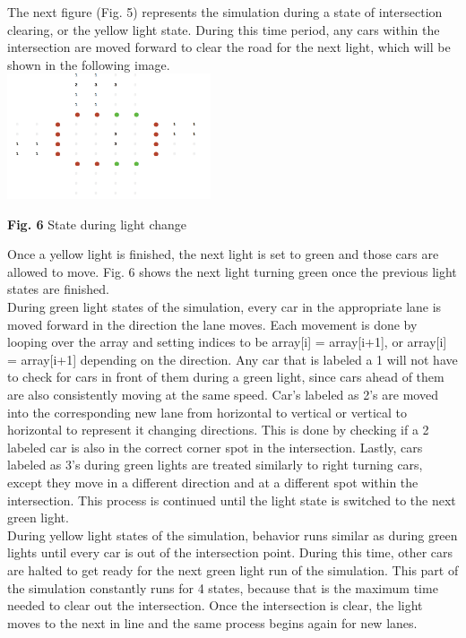 \documentclass[conference]{IEEEtran}
\begin{document}
The next figure (Fig. 5) represents the simulation during a state of intersection clearing, or the yellow light state. During this time period, any cars within the intersection are moved forward to clear the road for the next light, which will be shown in the following image. \\

\includegraphics[width=0.45\textwidth]{images/red}
\begin{center}
	\textbf{Fig. 6} State during light change  \\
\end{center}

Once a yellow light is finished, the next light is set to green and those cars are allowed to move. Fig. 6 shows the next light turning green once the previous light states are finished. \\

\hspace*{.2cm} During green light states of the simulation, every car in the appropriate lane is moved forward in the direction the lane moves. Each movement is done by looping over the array and setting indices to be array[i] = array[i+1], or array[i] = array[i+1] depending on the direction. Any car that is labeled a 1 will not have to check for cars in front of them during a green light, since cars ahead of them are also consistently moving at the same speed. Car's labeled as 2's are moved into the corresponding new lane from horizontal to vertical or vertical to horizontal to represent it changing directions. This is done by checking if a 2 labeled car is also in the correct corner spot in the intersection. Lastly, cars labeled as 3's during green lights are treated similarly to right turning cars, except they move in a different direction and at a different spot within the intersection. This process is continued until the light state is switched to the next green light. \\

\hspace*{.2cm} During yellow light states of the simulation, behavior runs similar as during green lights until every car is out of the intersection point. During this time, other cars are halted to get ready for the next green light run of the simulation. This part of the simulation constantly runs for 4 states, because that is the maximum time needed to clear out the intersection. Once the intersection is clear, the light moves to the next in line and the same process begins again for new lanes. \\
\end{document}
